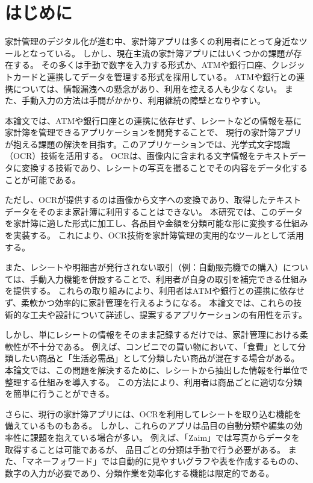 \documentclass[main]{subfiles}
\begin{document}
\chapter{はじめに}
\label{cha:intro}

家計管理のデジタル化が進む中、家計簿アプリは多くの利用者にとって身近なツールとなっている。
しかし、現在主流の家計簿アプリにはいくつかの課題が存在する。
その多くは手動で数字を入力する形式か、ATMや銀行口座、クレジットカードと連携してデータを管理する形式を採用している。
ATMや銀行との連携については、情報漏洩への懸念があり、利用を控える人も少なくない。
また、手動入力の方法は手間がかかり、利用継続の障壁となりやすい。

本論文では、ATMや銀行口座との連携に依存せず、レシートなどの情報を基に家計簿を管理できるアプリケーションを開発することで、
現行の家計簿アプリが抱える課題の解決を目指す。このアプリケーションでは、光学式文字認識（OCR）技術を活用する。
OCRは、画像内に含まれる文字情報をテキストデータに変換する技術であり、レシートの写真を撮ることでその内容をデータ化することが可能である。

ただし、OCRが提供するのは画像から文字への変換であり、取得したテキストデータをそのまま家計簿に利用することはできない。
本研究では、このデータを家計簿に適した形式に加工し、各品目や金額を分類可能な形に変換する仕組みを実装する。
これにより、OCR技術を家計簿管理の実用的なツールとして活用する。

また、レシートや明細書が発行されない取引（例：自動販売機での購入）については、手動入力機能を併設することで、利用者が自身の取引を補完できる仕組みを提供する。
これらの取り組みにより、利用者はATMや銀行との連携に依存せず、柔軟かつ効率的に家計管理を行えるようになる。
本論文では、これらの技術的な工夫や設計について詳述し、提案するアプリケーションの有用性を示す。


しかし、単にレシートの情報をそのまま記録するだけでは、家計管理における柔軟性が不十分である。
例えば、コンビニでの買い物において、「食費」として分類したい商品と「生活必需品」として分類したい商品が混在する場合がある。
本論文では、この問題を解決するために、レシートから抽出した情報を行単位で整理する仕組みを導入する。
この方法により、利用者は商品ごとに適切な分類を簡単に行うことができる。

さらに、現行の家計簿アプリには、OCRを利用してレシートを取り込む機能を備えているものもある。
しかし、これらのアプリは品目の自動分類や編集の効率性に課題を抱えている場合が多い。
例えば、「Zaim」では写真からデータを取得することは可能であるが、
品目ごとの分類は手動で行う必要がある。%
また、「マネーフォワード」では自動的に見やすいグラフや表を作成するものの、
数字の入力が必要であり、分類作業を効率化する機能は限定的である。
\end{document}
